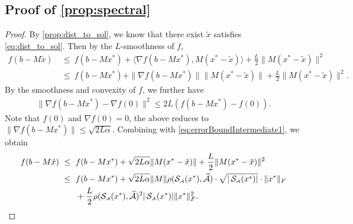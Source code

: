 \subsection{Proof of \autoref{prop:spectral}}
\begin{proof}
  By \autoref{prop:dist_to_sol}, we know that there exist $\tilde{x}$ satisfies \autoref{eq:dist_to_sol}.
  Then by the $L$-smoothness of $f$,
  \begin{align}
      f( b - M \tilde{x} ) &~\leq~ f( b - M x^* ) + \langle \nabla f( b - M x^* ), M( x^* - \tilde{x} ) \rangle + \frac{L}{2} \| M( x^* - \tilde{x} ) \|^2  \nonumber \\
      &~\leq~ f( b - M x^* ) + \| \nabla f( b - M x^* ) \| \| M( x^* - \tilde{x} ) \| + \frac{L}{2} \| M( x^* - \tilde{x} ) \|^2. \label{eq:errorBoundIntermediate1}
  \end{align}
  By the smoothness and convexity of $f$, we further have
  \begin{align*}
      \| \nabla f( b - M x^* ) - \nabla f(0) \|^2 \leq 2L ( f(b - M x^*) - f(0) ).
  \end{align*}
  Note that $f(0)$ and $\nabla f(0) = 0$, the above reduces to $\| \nabla f( b - M x^* ) \| \leq \sqrt{2 L \alpha}$. Combining with \autoref{eq:errorBoundIntermediate1}, we obtain
  \begin{align*}
      f( b - M \tilde{x} ) &~\leq~ f( b - M x^* ) + \sqrt{2 L \alpha} \| M( x^* - \tilde{x} ) \| + \frac{L}{2} \| M( x^* - \tilde{x} ) \|^2 \\
      &~\leq~ f( b - M x^* ) + \sqrt{2 L \alpha} \| M \| \rho( \operatorname{\mathcal{S}_{\scriptscriptstyle\mathcal{A}}}(x^*), \widehat{\mathcal{A}} )\cdot \sqrt{| \operatorname{\mathcal{S}_{\scriptscriptstyle\mathcal{A}}}(x^*) |} \cdot \| x^* \|_F  \\
      &\qquad + \frac{L}{2} \rho( \operatorname{\mathcal{S}_{\scriptscriptstyle\mathcal{A}}}(x^*), \widehat{\mathcal{A}} )^2 | \operatorname{\mathcal{S}_{\scriptscriptstyle\mathcal{A}}}(x^*) | \| x^* \|_F^2.
  \end{align*}
\end{proof}
























